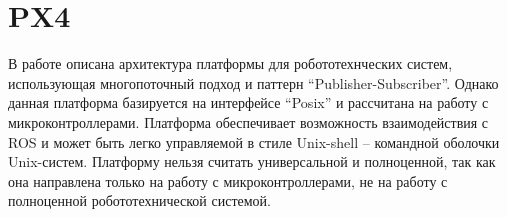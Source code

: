 \section{PX4}

В работе \cite{meier2015px4} описана архитектура платформы для робототехнческих систем, использующая многопоточный подход и паттерн “Publisher-Subscriber”. Однако данная платформа базируется на интерфейсе “Posix” и рассчитана на работу с микроконтроллерами. Платформа обеспечивает возможность взаимодействия с ROS и может быть легко управляемой в стиле Unix-shell – командной оболочки Unix-систем. Платформу нельзя считать универсальной и полноценной, так как она направлена только на работу с микроконтроллерами, не на работу с полноценной робототехнической системой.